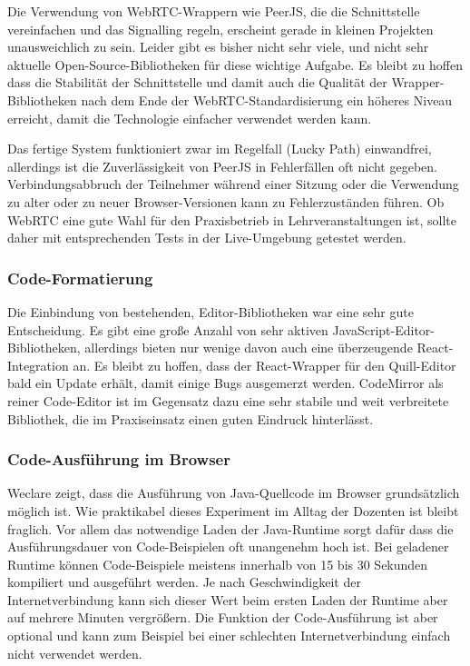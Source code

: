 Die Verwendung von WebRTC-Wrappern wie PeerJS, die die Schnittstelle vereinfachen und das Signalling regeln, erscheint gerade in kleinen Projekten unausweichlich zu sein. Leider gibt es bisher nicht sehr viele, und nicht sehr aktuelle Open-Source-Bibliotheken für diese wichtige Aufgabe. Es bleibt zu hoffen dass die Stabilität der Schnittstelle und damit auch die Qualität der Wrapper-Bibliotheken nach dem Ende der WebRTC-Standardisierung ein höheres Niveau erreicht, damit die Technologie einfacher verwendet werden kann.

Das fertige System funktioniert zwar im Regelfall (Lucky Path) einwandfrei, allerdings ist die Zuverlässigkeit von PeerJS in Fehlerfällen oft nicht gegeben. Verbindungsabbruch der Teilnehmer während einer Sitzung oder die Verwendung zu alter oder zu neuer Browser-Versionen kann zu Fehlerzuständen führen. Ob WebRTC eine gute Wahl für den Praxisbetrieb in Lehrveranstaltungen ist, sollte daher mit entsprechenden Tests in der Live-Umgebung getestet werden.

\subsubsection*{Code-Formatierung}
Die Einbindung von bestehenden, Editor-Bibliotheken war eine sehr gute Entscheidung. Es gibt eine große Anzahl von sehr aktiven JavaScript-Editor-Bibliotheken, allerdings bieten nur wenige davon auch eine überzeugende React-Integration an. Es bleibt zu hoffen, dass der React-Wrapper für den Quill-Editor bald ein Update erhält, damit einige Bugs ausgemerzt werden. CodeMirror als reiner Code-Editor ist im Gegensatz dazu eine sehr stabile und weit verbreitete Bibliothek, die im Praxiseinsatz einen guten Eindruck hinterlässt.

\subsubsection*{Code-Ausführung im Browser}
Weclare zeigt, dass die Ausführung von Java-Quellcode im Browser grundsätzlich möglich ist. Wie praktikabel dieses Experiment im Alltag der Dozenten ist bleibt fraglich. Vor allem das notwendige Laden der Java-Runtime sorgt dafür dass die Ausführungsdauer von Code-Beispielen oft unangenehm hoch ist. Bei geladener Runtime können Code-Beispiele meistens innerhalb von 15 bis 30 Sekunden kompiliert und ausgeführt werden. Je nach Geschwindigkeit der Internetverbindung kann sich dieser Wert beim ersten Laden der Runtime aber auf mehrere Minuten vergrößern. Die Funktion der Code-Ausführung ist aber  optional und kann zum Beispiel bei einer schlechten Internetverbindung einfach nicht verwendet werden.

